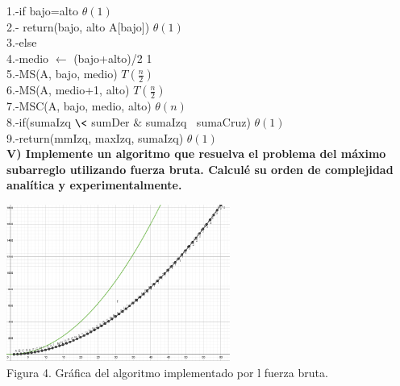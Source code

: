 \documentclass[spanish]{article}
\begin{document}
	1.-if bajo=alto \hspace{6cm} $ \theta(1) $ \\
        2.-\hspace{0.5cm} return(bajo, alto A[bajo]) \hspace{3cm} $ \theta(1) $ \\
        3.-else \\
        4.-medio $ \leftarrow $ (bajo+alto)/2 \hspace{5cm} 1 \\
        5.-MS(A, bajo, medio) \hspace{5.5cm} $ T(\frac{n}{2}) $ \\
        6.-MS(A, medio+1, alto) \hspace{5cm} $ T(\frac{n}{2}) $ \\
        7.-MSC(A, bajo, medio, alto) \hspace{4cm} $ \theta (n) $ \\
        8.-if(sumaIzq $ \< $ sumDer $ \& $ sumaIzq $ \> $ sumaCruz)  \hspace{1cm} $ \theta (1) $\\
        9.-return(mmIzq, maxIzq, sumaIzq)  \hspace{3cm} $ \theta (1) $\\

	\bigskip
\newpage
	{\large{\bf V) Implemente un algoritmo que resuelva el problema del máximo subarreglo utilizando fuerza bruta. Calculé su orden de complejidad analítica y experimentalmente.}}\\
	
	\bigskip
	
	\begin{center}
		\includegraphics[width=0.55\textwidth]{./imagenes/fb.png}\\
		Figura 4. Gráfica del algoritmo implementado por l fuerza bruta.\\
	\end{center}

	\bigskip
\end{document}
